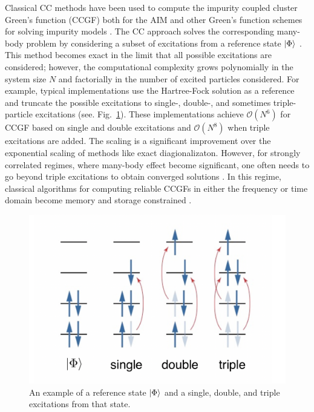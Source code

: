 \documentclass[aip,reprint,table,xcdraw,usenames,dvipsnames]{revtex4-1}
\begin{document}
Classical CC methods have been used to compute the impurity coupled cluster Green's function (CCGF) \cite{nooijen92_55, nooijen93_15, nooijen95_1681} both for the AIM and other Green's function schemes for solving impurity models \cite{PhysRevB.100.115154,JCTC.15.6010}. The CC approach solves the corresponding many-body problem by considering a subset of excitations from a reference state $\ket{\Phi}$ \cite{coester58_421, coester60_477, cizek66_4256, paldus72_50, purvis82_1910}. This method becomes exact in the limit that all possible excitations are considered; however, the computational complexity grows polynomially in the system size $N$ and factorially in the number of excited particles considered. For example, typical implementations use the Hartree-Fock solution as a reference and truncate the possible excitations to single-, double-, and sometimes triple-particle excitations (see. Fig.~\ref{fig:CCSD}). These implementations achieve $\mathcal{O}(N^6)$ for CCGF based on single and double excitations and $\mathcal{O}(N^8)$ when triple excitations are added. The scaling is a significant improvement over the exponential scaling of methods like exact diagionalizaton. However, 
for strongly correlated regimes, where many-body effect become significant, one often needs to go beyond triple excitations to obtain converged solutions \cite{Bartlett07RMP}. In this regime, classical algorithms for computing reliable CCGFs in either the frequency or time domain become memory and storage constrained \cite{kowalski16_144101, kowalski18_4335, peng19_3185, vila20_6983}.

\begin{figure}
    \centering
    \includegraphics[width=0.75\columnwidth, keepaspectratio]{CCSDT.png}
    \caption{An example of a reference state $\ket{\Phi}$ and a single, double, and triple excitations from that state.}
    \label{fig:CCSD}
\end{figure}
\end{document}
